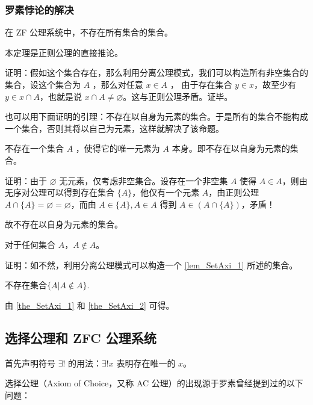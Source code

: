 \subsubsection{罗素悖论的解决}
\begin{theorem}{}
在 ZF 公\label{the_SetAxi_1}理系统中，不存在所有集合的集合。
\end{theorem}

本定理是正则公理的直接推论。

证明：假如这个集合存在，那么利用分离公理模式，我们可以构造所有非空集合的集合，设这个集合为 $A$ ，那么对任意 $x\in A$ ， 由于存在集合 $y\in x$，故至少有 $y\in x\cap A$，也就是说 $x\cap A\neq\varnothing$。这与正则公理矛盾。证毕。

也可以用下面证明的引理：不存在以自身为元素的集合。于是所有的集合不能构成一个集合，否则其将以自己为元素，这样就解决了该命题。

\begin{lemma}{}\label{lem_SetAxi_1}
不存在一个集合 $A$ ，使得它的唯一元素为 $A$ 本身。即不存在以自身为元素的集合。
\end{lemma}

证明：由于 $\varnothing$ 无元素，仅考虑非空集合。设存在一个非空集 $A$ 使得 $A \in A$，则由无序对公理可以得到存在集合 $\{A\}$，他仅有一个元素 $A$，由正则公理 $A\cap \{A\} = \varnothing = \varnothing$，而由 $A \in \{A\}, A \in A$ 得到 $A \in (A \cap \{A\})$，矛盾！

故不存在以自身为元素的集合。

\begin{theorem}{}\label{the_SetAxi_2}
对于任何集合 $A$，$A\notin A$。
\end{theorem}

证明：如不然，利用分离公理模式可以构造一个 \autoref{lem_SetAxi_1} 所述的集合。

\begin{theorem}{}
不存在集合$\{A|A\notin A\}$.
\end{theorem}

由 \autoref{the_SetAxi_1} 和 \autoref{the_SetAxi_2} 可得。

\subsection{选择公理和 ZFC 公理系统}

首先声明符号 $\exists! $ 的用法：$\exists ! x$ 表明存在唯一的 $x$。

选择公理（Axiom of Choice，又称 AC 公理）的出现源于罗素曾经提到过的以下问题：


